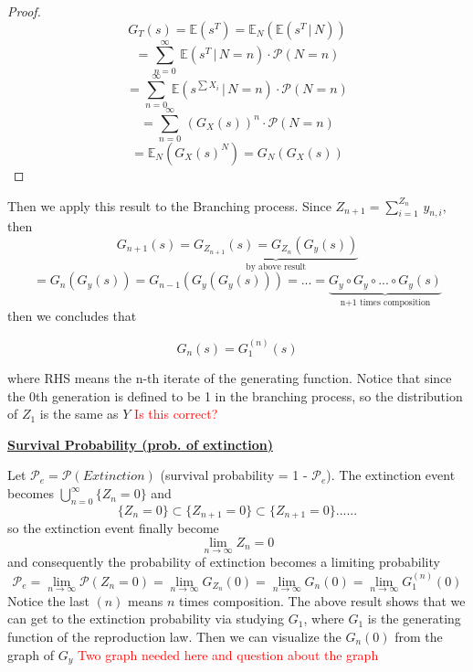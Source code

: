 \documentclass[10.5pt]{article}
\newcommand{\prob}[0]{\mathcal{P}}
\newcommand{\expt}[0]{\mathbb{E}}
\newenvironment{changemargin}[2]{%
  \begin{list}{}{%
    \setlength{\topsep}{0pt}%
    \setlength{\leftmargin}{#1}%
    \setlength{\rightmargin}{#2}%
    \setlength{\listparindent}{\parindent}%
    \setlength{\itemindent}{\parindent}%
    \setlength{\parsep}{\parskip}%
  }%
  \item[]}{\end{list}}
\begin{document}
\begin{changemargin}{-0.125in}{0in}
\begin{enumerate}
            \begin{proof}
            	\[
            	G_T(s) = \mathbb{E}(s^T) = \expt_N(\expt(s^T\,|\,N))
            	\]
            	\[
            	= \sum_{n = 0}^\infty\, \expt(s^T\,|\,N = n)\cdot \prob(N = n)
            	\]
            	\[
            	= \sum_{n = 0}^\infty\, \expt(s^{\sum X_i}\,|\,N = n)\cdot \prob(N = n) 
                \]
                \[
                 = \sum_{n = 0}^\infty\,(G_X(s))^n \cdot \prob(N = n)
                \]
                \[
                = \expt_N(G_X(s)^N) = G_N(G_X(s))
                \]
            \end{proof}
            
            Then we apply this result to the Branching process. Since $Z_{n+1} = \sum^{Z_n}_{i = 1}\,y_{n,i}$, then 
            \[
            G_{n+1}(s) = \underbrace{G_{Z_{n+1}} (s) = G_{Z_n}(G_y(s))}_{\text{by above result}}
            \]
            \[
            = G_n(G_y(s)) = G_{n-1}(G_y(G_y(s))) = ... = \underbrace{G_y\circ G_y \circ ... \circ G_y(s)}_{\text{n+1 times composition}}
            \]
            then we concludes that 
            
             \begin{tcolorbox}[notitle,boxrule=0pt,colback=blue!10,colframe=blue!20]
              \[
              G_n(s) = G_1^{(n)}(s)
              \]
              \end{tcolorbox}
            where RHS means the n-th iterate of the generating function. Notice that since the 0th generation is defined to be 1 in the branching process, so the distribution of $Z_1$ is the same as $Y$  \textcolor{red}{Is this correct?}
            
            \medskip
           
           \underline{\textbf{Survival Probability (prob. of extinction)}}
           
           \smallskip
           
           Let $\prob_e = \prob(Extinction)$ (survival probability = 1 - $\prob_e$). The extinction event becomes $\bigcup_{n = 0}^\infty \{Z_n = 0\}$ and 
           \[
           \{Z_n = 0\} \subset \{Z_{n+1} = 0\} \subset \{Z_{n+1} = 0\} ... ...
           \]
           so the extinction event finally become 
           \[
           \lim_{n \rightarrow \infty} Z_n = 0
           \]
           and consequently the probability of extinction becomes a limiting probability 
           \[
           \prob_e = \lim_{n \rightarrow \infty} \prob(Z_n = 0) = \lim_{n \rightarrow \infty}G_{Z_n} (0) = \lim_{n \rightarrow \infty}G_n(0) = \lim_{n \rightarrow \infty}G_1^{(n)}(0)
           \] 
            Notice the last $(n)$ means $n$ times composition. The above result shows that we can get to the extinction probability via studying $G_1$, where $G_1$ is the generating function of the reproduction law. Then we can visualize the $G_n(0)$ from the graph of $G_y$ \textcolor{red}{Two graph needed here and question about the graph}
            

\end{enumerate}
\end{changemargin}
\end{document}
